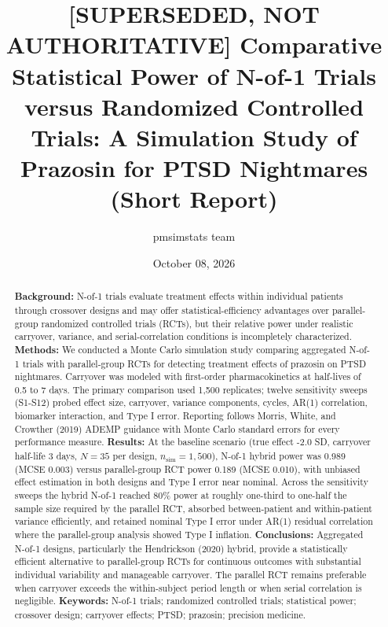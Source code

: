 \documentclass[
  11pt,
]{article}
\title{{[}SUPERSEDED, NOT AUTHORITATIVE{]} Comparative Statistical Power of N-of-1 Trials versus Randomized Controlled Trials: A Simulation Study of Prazosin for PTSD Nightmares (Short Report)}
\author{pmsimstats team}
\date{October 08, 2026}
\begin{document}
\maketitle
\begin{abstract}
\textbf{Background:} N-of-1 trials evaluate treatment effects within
individual patients through crossover designs and may offer
statistical-efficiency advantages over parallel-group randomized
controlled trials (RCTs), but their relative power under realistic
carryover, variance, and serial-correlation conditions is
incompletely characterized. \textbf{Methods:} We conducted a Monte
Carlo simulation study comparing aggregated N-of-1 trials with
parallel-group RCTs for detecting treatment effects of prazosin
on PTSD nightmares. Carryover was modeled with first-order
pharmacokinetics at half-lives of 0.5 to 7 days. The primary
comparison used 1,500 replicates; twelve sensitivity sweeps
(S1-S12) probed effect size, carryover, variance components,
cycles, AR(1) correlation, biomarker interaction, and Type I
error. Reporting follows Morris, White, and Crowther (2019) ADEMP
guidance with Monte Carlo standard errors for every performance
measure. \textbf{Results:} At the baseline scenario (true effect
-2.0 SD, carryover half-life 3 days, \(N = 35\) per design,
\(n_{\text{sim}} = 1{,}500\)), N-of-1 hybrid power was 0.989
(MCSE 0.003) versus parallel-group RCT power 0.189 (MCSE 0.010),
with unbiased effect estimation in both designs and Type I
error near nominal. Across the sensitivity sweeps the hybrid
N-of-1 reached 80\% power at roughly one-third to one-half the
sample size required by the parallel RCT, absorbed
between-patient and within-patient variance efficiently, and
retained nominal Type I error under AR(1) residual correlation
where the parallel-group analysis showed Type I inflation.
\textbf{Conclusions:} Aggregated N-of-1 designs, particularly the
Hendrickson (2020) hybrid, provide a statistically efficient
alternative to parallel-group RCTs for continuous outcomes with
substantial individual variability and manageable carryover. The
parallel RCT remains preferable when carryover exceeds the
within-subject period length or when serial correlation is
negligible. \textbf{Keywords:} N-of-1 trials; randomized controlled
trials; statistical power; crossover design; carryover effects;
PTSD; prazosin; precision medicine.
\end{abstract}
\end{document}
